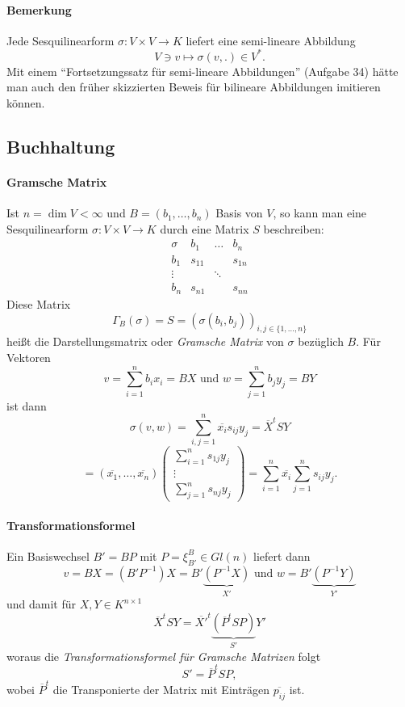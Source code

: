 \paragraph{Bemerkung}
	Jede Sesquilinearform $ \sigma: V\times V\to K $ liefert eine semi-lineare Abbildung
		\[ V\ni v\mapsto \sigma(v,.)\in V^*. \]
	Mit einem "`Fortsetzungssatz für semi-lineare Abbildungen"' (Aufgabe 34) hätte man auch den früher skizzierten Beweis für bilineare Abbildungen imitieren können.

\subsection{Buchhaltung}
\paragraph{Gramsche Matrix}
	Ist $ n=\dim V < \infty $ und $ B=(b_1,\dots,b_n) $ Basis von $ V $, so kann man eine Sesquilinearform $ \sigma: V\times V\to K $ durch eine Matrix $ S $ beschreiben:
	\[ \begin{array}{c|ccc}
	\sigma & b_1 & \dots & b_n \\ \hline
	b_1 & s_{11} &  & s_{1n} \\ 
	\vdots &  & \ddots &  \\ 
	b_n & s_{n1} &  & s_{nn}
	\end{array}  \]
	Diese Matrix
		\[ \Gamma_B(\sigma) = S = \left(\sigma(b_i,b_j)\right)_{i,j\in \{1,\dots,n\}} \]
	heißt die Darstellungsmatrix oder \emph{Gramsche Matrix} von $ \sigma $ bezüglich $ B $. Für Vektoren
		\[ v = \sum_{i=1}^{n}b_ix_i = BX \text{ und } w = \sum_{j=1}^{n}b_jy_j = BY \]
	ist dann
		\[ \sigma(v,w) = \sum_{i,j=1}^{n}\overline{x_i}s_{ij}y_j = \overline{X}^tSY \]
		\[ = (\overline{x_1},\dots,\overline{x_n})\begin{pmatrix}
		\sum_{i=1}^{n}s_{1j}y_j\\ \vdots\\ \sum_{j=1}^{n}s_{nj}y_j
		\end{pmatrix} = \sum_{i=1}^{n}\overline{x_i}\sum_{j=1}^{n}s_{ij}y_j. \]
\paragraph{Transformationsformel}
	Ein Basiswechsel $ B' = BP $ mit $ P = \xi_{B'}^B \in Gl(n)$ liefert dann
		\[ v = BX = (B'P^{-1})X = B' \underbrace{(P^{-1}X)}_{X'} \text{ und } w = B' \underbrace{(P^{-1}Y)}_{Y'} \]
	und damit für $ X,Y \in K^{n\times 1} $
		\[ \overline{X}^tSY = \overline{X'}^t \underbrace{(\overline{P}^tSP)}_{S'} Y' \]
	woraus die \emph{Transformationsformel für Gramsche Matrizen} folgt
		\[ S' = \overline{P}^tSP, \]
	wobei $ \overline{P}^t $ die Transponierte der Matrix mit Einträgen $ \overline{p_{ij}} $ ist.
